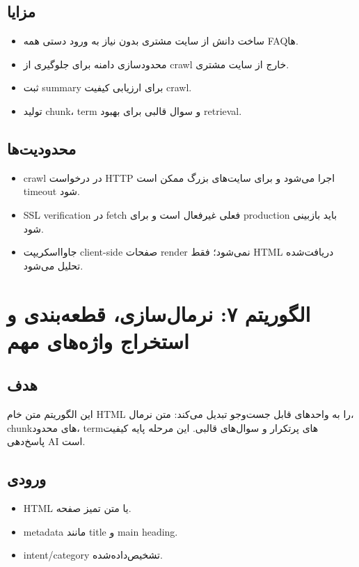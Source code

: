\documentclass[12pt,a4paper]{article}
\begin{document}
\subsection{مزایا}
\begin{itemize}
  \item ساخت دانش از سایت مشتری بدون نیاز به ورود دستی همه FAQها.
  \item محدودسازی دامنه برای جلوگیری از crawl خارج از سایت مشتری.
  \item ثبت summary برای ارزیابی کیفیت crawl.
  \item تولید chunk، term و سوال قالبی برای بهبود retrieval.
\end{itemize}

\subsection{محدودیت‌ها}
\begin{itemize}
  \item crawl در درخواست HTTP اجرا می‌شود و برای سایت‌های بزرگ ممکن است timeout شود.
  \item SSL verification در fetch فعلی غیرفعال است و برای production باید بازبینی شود.
  \item جاوااسکریپت client-side صفحات render نمی‌شود؛ فقط HTML دریافت‌شده تحلیل می‌شود.
\end{itemize}

\newpage
\section{الگوریتم ۷: نرمال‌سازی، قطعه‌بندی و استخراج واژه‌های مهم}
\subsection{هدف}
این الگوریتم متن خام HTML را به واحدهای قابل جست‌وجو تبدیل می‌کند: متن نرمال، chunkهای محدود، termهای پرتکرار و سوال‌های قالبی. این مرحله پایه کیفیت پاسخ‌دهی AI است.

\subsection{ورودی}
\begin{itemize}
  \item HTML یا متن تمیز صفحه.
  \item metadata مانند title و main heading.
  \item intent/category تشخیص‌داده‌شده.
\end{itemize}
\end{document}
